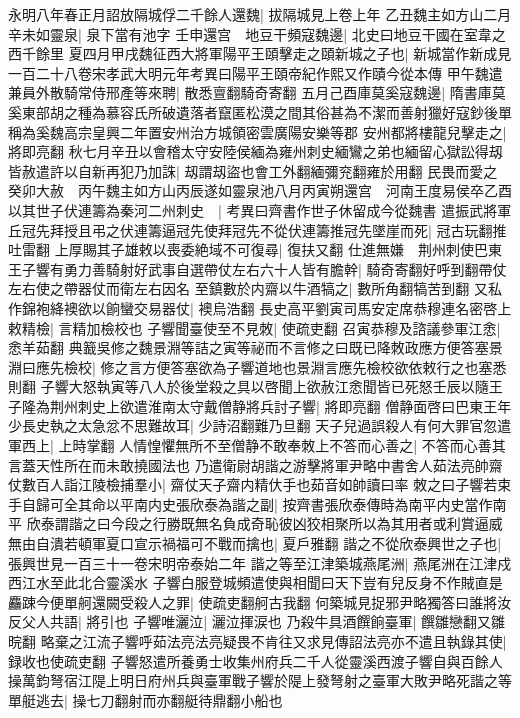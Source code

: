 永明八年春正月詔放隔城俘二千餘人還魏|{
	拔隔城見上卷上年}
乙丑魏主如方山二月辛未如靈泉|{
	泉下當有池字}
壬申還宫　地豆干頻寇魏邊|{
	北史曰地豆干國在室韋之西千餘里}
夏四月甲戌魏征西大將軍陽平王頤擊走之頤新城之子也|{
	新城當作新成見一百二十八卷宋孝武大明元年考異曰陽平王頤帝紀作熙又作賾今從本傳}
甲午魏遣兼員外散騎常侍邢產等來聘|{
	散悉亶翻騎奇寄翻}
五月己酉庫莫奚寇魏邊|{
	隋書庫莫奚東部胡之種為慕容氏所破遺落者竄匿松漠之間其俗甚為不潔而善射獵好寇鈔後單稱為奚魏高宗皇興二年置安州治方城領密雲廣陽安樂等郡}
安州都將樓龍兒擊走之|{
	將即亮翻}
秋七月辛丑以會稽太守安陸侯緬為雍州刺史緬鸞之弟也緬留心獄訟得刼皆赦遣許以自新再犯乃加誅|{
	刼謂刼盜也會工外翻緬彌兖翻雍於用翻}
民畏而愛之　癸卯大赦　丙午魏主如方山丙辰遂如靈泉池八月丙寅朔還宫　河南王度易侯卒乙酉以其世子伏連籌為秦河二州刺史　|{
	考異曰齊書作世子休留成今從魏書}
遣振武將軍丘冠先拜授且弔之伏連籌逼冠先使拜冠先不從伏連籌推冠先墜崖而死|{
	冠古玩翻推吐雷翻}
上厚賜其子雄敕以喪委絶域不可復尋|{
	復扶又翻}
仕進無嫌　荆州刺使巴東王子響有勇力善騎射好武事自選帶仗左右六十人皆有膽幹|{
	騎奇寄翻好呼到翻帶仗左右使之帶器仗而衛左右因名}
至鎮數於内齋以牛酒犒之|{
	數所角翻犒苦到翻}
又私作錦袍絳襖欲以餉蠻交易器仗|{
	襖烏浩翻}
長史高平劉寅司馬安定席恭穆連名密啓上敕精檢|{
	言精加檢校也}
子響聞臺使至不見敇|{
	使疏吏翻}
召寅恭穆及諮議參軍江悆|{
	悆羊茹翻}
典籖吳修之魏景淵等詰之寅等祕而不言修之曰既已降敇政應方便答塞景淵曰應先檢校|{
	修之言方便答塞欲為子響道地也景淵言應先檢校欲依敕行之也塞悉則翻}
子響大怒執寅等八人於後堂殺之具以啓聞上欲赦江悆聞皆已死怒壬辰以隨王子隆為荆州刺史上欲遣淮南太守戴僧静將兵討子響|{
	將即亮翻}
僧静面啓曰巴東王年少長史執之太急忿不思難故耳|{
	少詩沼翻難乃旦翻}
天子兒過誤殺人有何大罪官忽遣軍西上|{
	上時掌翻}
人情惶懼無所不至僧静不敢奉敇上不答而心善之|{
	不答而心善其言蓋天性所在而未敢撓國法也}
乃遣衛尉胡諧之游擊將軍尹略中書舍人茹法亮帥齋仗數百人詣江陵檢捕羣小|{
	齋仗天子齋内精㐲手也茹音如帥讀曰率}
敇之曰子響若束手自歸可全其命以平南内史張欣泰為諧之副|{
	按齊書張欣泰傳時為南平内史當作南平}
欣泰謂諧之曰今段之行勝既無名負成奇恥彼凶狡相聚所以為其用者或利賞逼威無由自潰若頓軍夏口宣示禍福可不戰而擒也|{
	夏戶雅翻}
諧之不從欣泰興世之子也|{
	張興世見一百三十一卷宋明帝泰始二年}
諧之等至江津築城燕尾洲|{
	燕尾洲在江津戍西江水至此北合靈溪水}
子響白服登城頻遣使與相聞曰天下豈有兒反身不作賊直是麤踈今便單舸還闕受殺人之罪|{
	使疏吏翻舸古我翻}
何築城見捉邪尹略獨答曰誰將汝反父人共語|{
	將引也}
子響唯灑泣|{
	灑泣揮涙也}
乃殺牛具酒饌餉臺軍|{
	饌雛戀翻又雛晥翻}
略棄之江流子響呼茹法亮法亮疑畏不肯往又求見傳詔法亮亦不遣且執錄其使|{
	録收也使疏吏翻}
子響怒遣所養勇士收集州府兵二千人從靈溪西渡子響自與百餘人操萬鈞弩宿江隄上明日府州兵與臺軍戰子響於隄上發弩射之臺軍大敗尹略死諧之等單艇逃去|{
	操七刀翻射而亦翻艇待鼎翻小船也}
